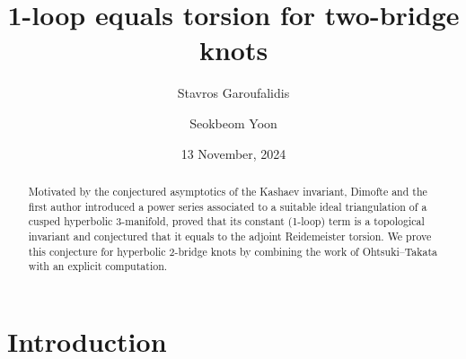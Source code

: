 \documentclass[12pt,reqno]{amsart}
\theoremstyle{definition}
\begin{document}
	
\title[1-loop equals torsion for two-bridge knots]{1-loop equals torsion for
  two-bridge knots}
\author{Stavros Garoufalidis}
\address{%
International Center for Mathematics, Department of Mathematics \\
Southern University of Science and Technology \\
Shenzhen, China
\newline
{\tt \url{http://people.mpim-bonn.mpg.de/stavros}}}

\author{Seokbeom Yoon}
\address{Department of Mathematics \\
Chonnam National University \\
Gwangju, South Korea \newline
{\tt \url{http://sites.google.com/view/seokbeom}}}


\date{13 November, 2024}%

\begin{abstract}
  Motivated by the conjectured asymptotics of the Kashaev invariant, Dimofte and
  the first author introduced a power series associated to a suitable ideal
  triangulation of a cusped hyperbolic 3-manifold, proved that its constant
  (1-loop) term is a topological invariant and conjectured that it equals to the
  adjoint Reidemeister torsion. We prove this conjecture for hyperbolic 
  2-bridge knots by combining the work of Ohtsuki--Takata with an explicit computation.
\end{abstract}

\maketitle
{
\footnotesize
\tableofcontents
}

\section{Introduction}
\label{sec.intro}
\end{document}

